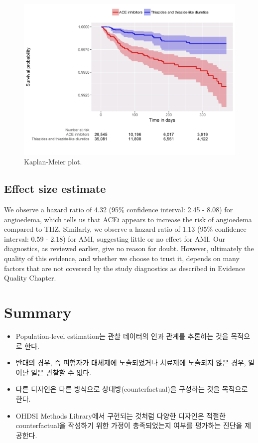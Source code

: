 \documentclass[]{book}
\begin{document}
\begin{figure}

{\centering \includegraphics[width=1\linewidth]{images/PopulationLevelEstimation/kmPlot} 

}

\caption{Kaplan-Meier plot.}\label{fig:kmPlot}
\end{figure}

\hypertarget{effect-size-estimate}{%
\subsection{Effect size estimate}\label{effect-size-estimate}}

We observe a hazard ratio of 4.32 (95\% confidence interval: 2.45 - 8.08) for angioedema, which tells us that ACEi appears to increase the risk of angioedema compared to THZ. Similarly, we observe a hazard ratio of 1.13 (95\% confidence interval: 0.59 - 2.18) for AMI, suggesting little or no effect for AMI. Our diagnostics, as reviewed earlier, give no reason for doubt. However, ultimately the quality of this evidence, and whether we choose to trust it, depends on many factors that are not covererd by the study diagnostics as described in Evidence Quality Chapter.

\hypertarget{summary}{%
\section{Summary}\label{summary}}

\begin{itemize}
\item
  Population-level estimation는 관찰 데이터의 인과 관계를 추론하는 것을 목적으로 한다.
\item
  반대의 경우, 즉 피험자가 대체제에 노출되었거나 치료제에 노출되지 않은 경우, 일어난 일은 관찰할 수 없다.
\item
  다른 디자인은 다른 방식으로 상대방(counterfactual)을 구성하는 것을 목적으로 한다.
\item
  OHDSI Methods Library에서 구현되는 것처럼 다양한 디자인은 적절한 counterfactual을 작성하기 위한 가정이 충족되었는지 여부를 평가하는 진단을 제공한다.
\end{itemize}
\end{document}
